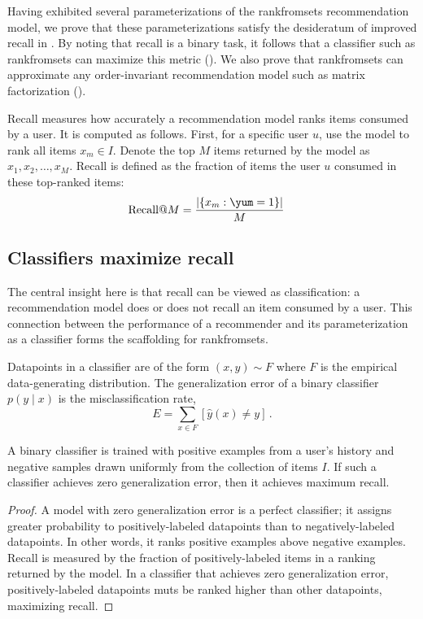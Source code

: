 Having exhibited several parameterizations of the \acrshort{rankfromsets}
recommendation model, we prove that these parameterizations satisfy the
desideratum of improved recall in . By noting that recall
is a binary task, it follows that a classifier such as \acrshort{rankfromsets}
can maximize this metric (). We also prove that
\acrshort{rankfromsets} can approximate any order-invariant recommendation model
such as matrix factorization ().

Recall measures how accurately a recommendation model ranks items consumed by a
user. It is computed as follows. First, for a specific user $u$, use the model
to rank all items $x_m \in I$. Denote the top $M$ items returned by the model as
${x_1, x_2, \ldots, x_M}$. Recall is defined as the fraction of items the user
$u$ consumed in these top-ranked items:
\begin{align}
  \textrm{Recall@}M &= \frac{\lvert \{x_m : \yum = 1 \} \rvert }{M}
\label{eq:recall}
\end{align}

\subsection{Classifiers maximize recall}
\label{sec:optimal}

The central insight here is that recall can be viewed as classification: a
recommendation model does or does not recall an item consumed by a user. This
connection between the performance of a recommender and its parameterization as
a classifier forms the scaffolding for \acrshort{rankfromsets}.

Datapoints in a classifier are of the form $(x, y) \sim F$ where $F$ is the
empirical data-generating distribution. The generalization error of a binary
classifier $p(y \mid x)$ is the misclassification rate,
\begin{equation}
E = \sum_{x \in F} \left[ \hat y(x) \neq y \right] \, .
\end{equation}
\begin{proposition}
  A binary classifier is trained with positive examples from a user's history
  and negative samples drawn uniformly from the collection of items $I$. If such
  a classifier achieves zero generalization error, then it achieves maximum
  recall.
  \label{prop:1}
\end{proposition}
\begin{proof}
  A model with zero generalization error is a perfect classifier; it assigns
  greater probability to positively-labeled datapoints than to
  negatively-labeled datapoints. In other words, it ranks positive examples
  above negative examples. Recall is measured by the fraction of
  positively-labeled items in a ranking returned by the model. In a classifier
  that achieves zero generalization error, positively-labeled datapoints muts be
  ranked higher than other datapoints, maximizing recall.
\end{proof}

